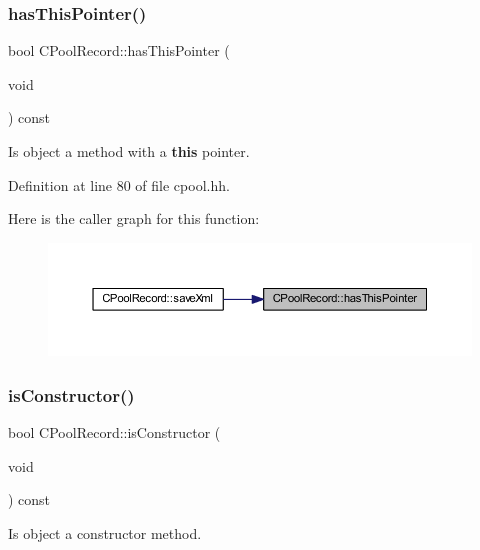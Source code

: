 \subsubsection{\texorpdfstring{hasThisPointer()}{hasThisPointer()}}
{\footnotesize\ttfamily bool C\+Pool\+Record\+::has\+This\+Pointer (\begin{DoxyParamCaption}\item[{void}]{ }\end{DoxyParamCaption}) const\hspace{0.3cm}{\ttfamily [inline]}}



Is object a method with a {\bfseries{this}} pointer. 



Definition at line 80 of file cpool.\+hh.

Here is the caller graph for this function\+:
\nopagebreak
\begin{figure}[H]
\begin{center}
\leavevmode
\includegraphics[width=350pt]{class_c_pool_record_aed45b0c5aa82d79039282045a43ee3d9_icgraph}
\end{center}
\end{figure}
\mbox{\label{class_c_pool_record_a7ab36868403f7334cbd764bd57ac78a7}} 
\subsubsection{\texorpdfstring{isConstructor()}{isConstructor()}}
{\footnotesize\ttfamily bool C\+Pool\+Record\+::is\+Constructor (\begin{DoxyParamCaption}\item[{void}]{ }\end{DoxyParamCaption}) const\hspace{0.3cm}{\ttfamily [inline]}}



Is object a constructor method. 



